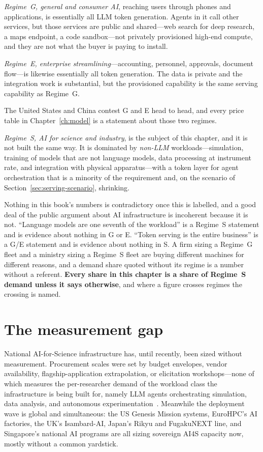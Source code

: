 \emph{Regime~G, general and consumer AI}, reaching users through phones and applications, is essentially all LLM token generation. Agents in it call other services, but those services are public and shared---web search for deep research, a maps endpoint, a code sandbox---not privately provisioned high-end compute, and they are not what the buyer is paying to install.

\emph{Regime~E, enterprise streamlining}---accounting, personnel, approvals, document flow---is likewise essentially all token generation. The data is private and the integration work is substantial, but the provisioned capability is the same serving capability as Regime~G.

The United States and China contest G and E head to head, and every price table in Chapter~\ref{ch:model} is a statement about those two regimes.

\emph{Regime~S, AI for science and industry}, is the subject of this chapter, and it is not built the same way. It is dominated by \emph{non-LLM} workloads---simulation, training of models that are not language models, data processing at instrument rate, and integration with physical apparatus---with a token layer for agent orchestration that is a minority of the requirement and, on the scenario of Section~\ref{sec:serving-scenario}, shrinking.

Nothing in this book's numbers is contradictory once this is labelled, and a good deal of the public argument about AI infrastructure is incoherent because it is not. ``Language models are one seventh of the workload'' is a Regime~S statement and is evidence about nothing in G or E. ``Token serving is the entire business'' is a G/E statement and is evidence about nothing in S. A firm sizing a Regime~G fleet and a ministry sizing a Regime~S fleet are buying different machines for different reasons, and a demand share quoted without its regime is a number without a referent. \textbf{Every share in this chapter is a share of Regime~S demand unless it says otherwise}, and where a figure crosses regimes the crossing is named.

\section{The measurement gap}
\label{sec:measgap}

National AI-for-Science infrastructure has, until recently, been sized without measurement. Procurement scales were set by budget envelopes, vendor availability, flagship-application extrapolation, or elicitation workshops---none of which measures the per-researcher demand of the workload class the infrastructure is being built for, namely LLM agents orchestrating simulation, data analysis, and autonomous experimentation~\cite{ai4s-framework}. Meanwhile the deployment wave is global and simultaneous: the US Genesis Mission systems, EuroHPC's AI factories, the UK's Isambard-AI, Japan's Rikyu and FugakuNEXT line, and Singapore's national AI programs are all sizing sovereign AI4S capacity now, mostly without a common yardstick.

